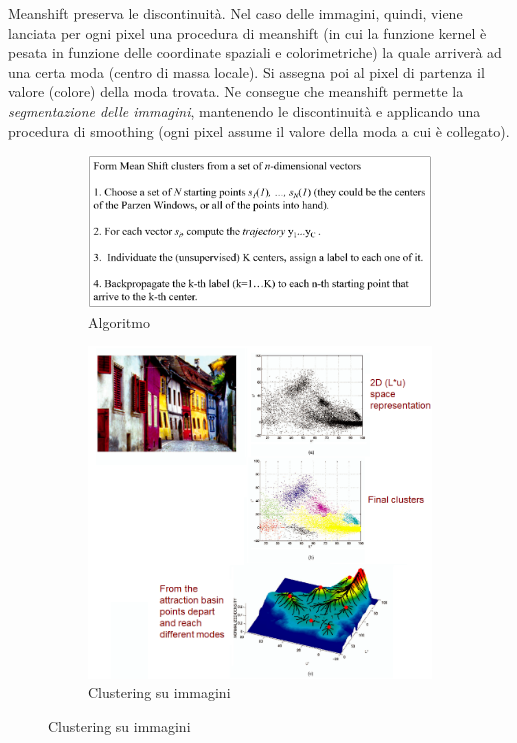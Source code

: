 \documentclass[a4paper,oneside,titlepage]{book}
\begin{document}
Meanshift preserva le discontinuità. Nel caso delle immagini, quindi, viene lanciata per ogni pixel una procedura di meanshift (in cui la funzione kernel è pesata in funzione delle coordinate spaziali e colorimetriche) la quale arriverà ad una certa moda (centro di massa locale). Si assegna poi al pixel di partenza il valore (colore) della moda trovata. Ne consegue che meanshift permette la \textit{segmentazione delle immagini}, mantenendo le discontinuità e applicando una procedura di smoothing (ogni pixel assume il valore della moda a cui è collegato).
\begin{figure}[htp]
	\begin{subfigure}{0.49\textwidth}
	    \centering
		\includegraphics[width=\textwidth, height=\textheight, keepaspectratio]{clustering1.png}
		\caption{Algoritmo}
	\end{subfigure}
	\hfill
	\begin{subfigure}{0.49\textwidth}
	    \centering
		\includegraphics[width=\textwidth, height=\textheight, keepaspectratio]{clustering2.png}
		\caption{Clustering su immagini}
	\end{subfigure}
\end{figure}
\end{document}
